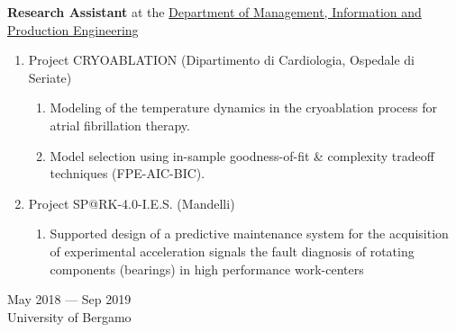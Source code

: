 \documentclass[10pt]{article}
\begin{document}
\begin{minipage}[t]{.80\textwidth}
	\raggedright
	\textbf{Research Assistant} at the \href{https://digip.unibg.it/}{Department of Management, Information and Production Engineering}
	\begin{enumerate}
		\item Project CRYOABLATION ({\small Dipartimento di Cardiologia, Ospedale di Seriate})
		\begin{enumerate}
			\item Modeling of the temperature dynamics in the cryoablation process for atrial fibrillation therapy.
			\item Model selection using in-sample goodness-of-fit \& complexity tradeoff techniques (FPE-AIC-BIC).
		\end{enumerate}
		\item Project SP@RK-4.0-I.E.S. ({\small Mandelli})
		\begin{enumerate}
			\item Supported design of a predictive maintenance system for the acquisition of experimental acceleration signals the fault diagnosis of rotating components (bearings) in high performance work-centers
		\end{enumerate}
  \end{enumerate}
\end{minipage}%
\hspace{.02\textwidth}\vrule\hspace{.02\textwidth}
\begin{minipage}[t]{.16\textwidth}
	\raggedleft
	May 2018 --- Sep 2019\\
	\small University of Bergamo\\
\end{minipage}%
\par\vspace{6pt}
\noindent
\end{document}
